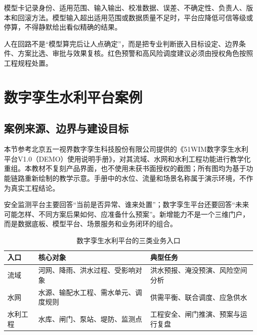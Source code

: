 模型卡记录身份、适用范围、输入输出、校准数据、误差、不确定性、负责人、版本和回滚方法。模型输入超出适用范围或数据质量不足时，平台应降低可信等级或停算，不得静默给出看似精确的结果。

人在回路不是“模型算完后让人点确定”，而是把专业判断嵌入目标设定、边界条件、方案比选、审批与效果复核。红色预警和高风险调度建议必须由授权角色按照工程规程处置。

\section{数字孪生水利平台案例}\label{sec:digital-twin-case}

\subsection{案例来源、边界与建设目标}

本节参考北京五一视界数字孪生科技股份有限公司提供的《51WIM数字孪生水利平台V1.0（DEMO）使用说明手册》，对其流域、水网和水利工程功能进行教学化重组\cite{wuyi2026wim}。本教材不复刻产品界面，也不使用未获书面授权的截图；所有图均为基于功能链路重新绘制的教学示意。手册中的水位、流量和场景名称属于演示环境，不作为真实工程结论。

安全监测平台主要回答“当前是否异常、谁来处置”；数字孪生平台还要回答“未来可能怎样、不同方案后果如何、应准备什么预案”。新增能力不是一个三维门户，而是数据底板、模型平台、场景服务和业务闭环的组合。

\begin{table}[htbp]
\centering
\caption{数字孪生水利平台的三类业务入口}
\label{tab:twin-three-portals}
\begin{tabular}{p{2.5cm}p{4.4cm}p{5.5cm}}
\toprule
入口 & 核心对象 & 典型任务 \\
\midrule
流域 & 河网、降雨、洪水过程、受影响对象 & 洪水预报、淹没预演、风险空间分析 \\
水网 & 水源、输配水工程、需水单元、调度规则 & 供需平衡、联合调度、应急供水 \\
水利工程 & 水库、闸门、泵站、堤防、监测点 & 工程安全、闸门推演、预案与运行复盘 \\
\bottomrule
\end{tabular}
\end{table}

